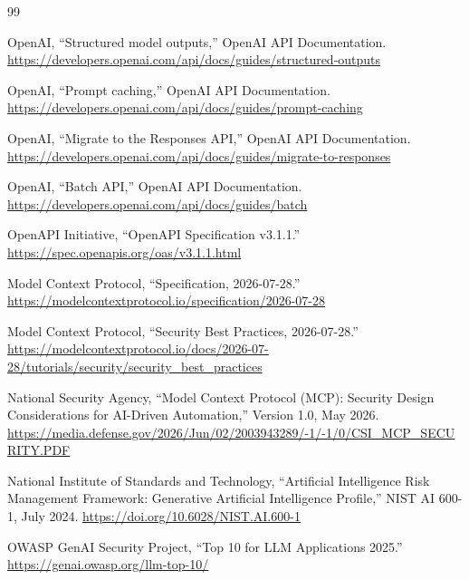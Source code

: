 \documentclass[10pt]{article}
\begin{document}
\begin{thebibliography}{99}
\small

OpenAI, ``Structured model outputs,'' OpenAI API Documentation.\newline
\url{https://developers.openai.com/api/docs/guides/structured-outputs}

OpenAI, ``Prompt caching,'' OpenAI API Documentation.\newline
\url{https://developers.openai.com/api/docs/guides/prompt-caching}

OpenAI, ``Migrate to the Responses API,'' OpenAI API Documentation.\newline
\url{https://developers.openai.com/api/docs/guides/migrate-to-responses}

OpenAI, ``Batch API,'' OpenAI API Documentation.\newline
\url{https://developers.openai.com/api/docs/guides/batch}

OpenAPI Initiative, ``OpenAPI Specification v3.1.1.''\newline
\url{https://spec.openapis.org/oas/v3.1.1.html}

Model Context Protocol, ``Specification, 2026-07-28.''\newline
\url{https://modelcontextprotocol.io/specification/2026-07-28}

Model Context Protocol, ``Security Best Practices, 2026-07-28.''\newline
\url{https://modelcontextprotocol.io/docs/2026-07-28/tutorials/security/security_best_practices}

National Security Agency, ``Model Context Protocol (MCP): Security Design Considerations for AI-Driven Automation,'' Version 1.0, May 2026.\newline
\url{https://media.defense.gov/2026/Jun/02/2003943289/-1/-1/0/CSI_MCP_SECURITY.PDF}

National Institute of Standards and Technology, ``Artificial Intelligence Risk Management Framework: Generative Artificial Intelligence Profile,'' NIST AI 600-1, July 2024.\newline
\url{https://doi.org/10.6028/NIST.AI.600-1}

OWASP GenAI Security Project, ``Top 10 for LLM Applications 2025.''\newline
\url{https://genai.owasp.org/llm-top-10/}


\end{thebibliography}
\end{document}
